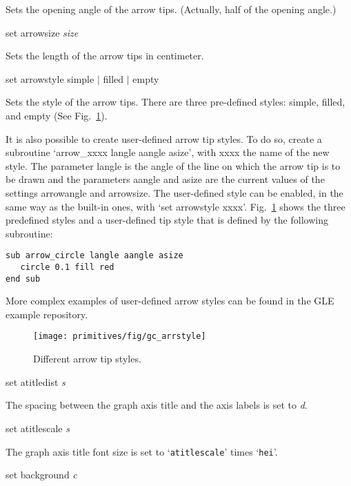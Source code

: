 \begin{commanddescription}
Sets the opening angle of the arrow tips. (Actually, half of the opening angle.)

\item[{\sf set arrowsize {\it size}}]

Sets the length of the arrow tips in centimeter.

\item[{\sf set arrowstyle simple $|$ filled $|$ empty}]

Sets the style of the arrow tips. There are three pre-defined styles: simple, filled, and empty (See Fig.~\ref{arrsty:fig}).

It is also possible to create user-defined arrow tip styles. To do so, create a subroutine `{\sf arrow\_xxxx langle aangle asize}', with {\sf xxxx} the name of the new style. The parameter {\sf langle} is the angle of the line on which the arrow tip is to be drawn and the parameters {\sf aangle} and {\sf asize} are the current values of the settings {\sf arrowangle} and {\sf arrowsize}. The user-defined style can be enabled, in the same way as the built-in ones, with `{\sf set arrowstyle xxxx}'. Fig.~\ref{arrsty:fig} shows the three predefined styles and a user-defined tip style that is defined by the following subroutine:

\begin{Verbatim}
sub arrow_circle langle aangle asize
   circle 0.1 fill red
end sub
\end{Verbatim}

\noindent{}More complex examples of user-defined arrow styles can be found in the GLE example repository.

\begin{figure}
\centering
\texttt{[image: primitives/fig/gc\_arrstyle]}
\caption{\label{arrsty:fig}Different arrow tip styles.}
\end{figure}

\item[{\sf set atitledist {\it s}}]

The spacing between the graph axis title and the axis labels is set to {\it d}.

\item[{\sf set atitlescale {\it s}}]

The graph axis title font size is set to `\texttt{atitlescale}' times `\texttt{hei}'.

\item[{\sf set background {\it c}}]


\end{commanddescription}
